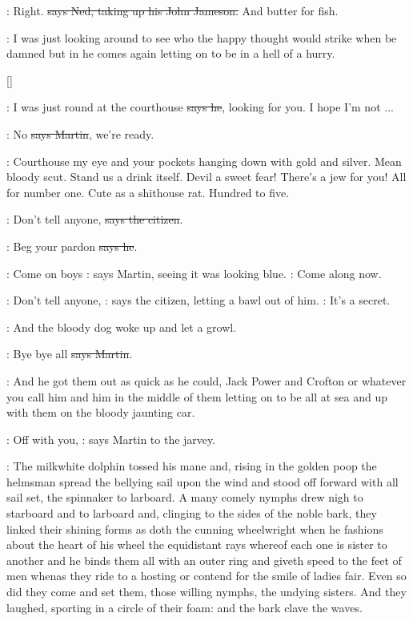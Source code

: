 \lambert:
Right. \sout{says Ned, taking up his John Jameson.}
And butter for fish.

\Nq:
I was just looking around to see who the happy thought would strike
when be damned but in he comes again letting on to be in a hell of a
hurry.

[]

\Bloom:
I was just round at the courthouse \sout{says he},
looking for you. I hope I'm
not ...

\cunningham:
No \sout{says Martin}, we're ready.

\Nq:
Courthouse my eye and your pockets hanging down with gold and silver.
Mean bloody scut. Stand us a drink itself. Devil a sweet fear! There's
a jew for you! All for number one. Cute as a shithouse rat. Hundred to
five.

\citizen:
Don't tell anyone, \sout{says the citizen}.

\Bloom:
Beg your pardon \sout{says he}.

\cunningham:
Come on boys
\Nq:
says Martin, seeing it was looking blue.
\cunningham:
Come along now.

\citizen:
Don't tell anyone,
\Nq:
says the citizen, letting a bawl out of him.
\citizen:
It's a secret.

\Nq:
And the bloody dog woke up and let a growl.

\cunningham:
Bye bye all \sout{says Martin}.

\Nq:
And he got them out as quick as he could, Jack Power and Crofton or
whatever you call him and him in the middle of them letting on to be all
at sea and up with them on the bloody jaunting car.

\cunningham:
Off with you,
\Nq:
says Martin to the jarvey.

:
The milkwhite dolphin tossed his mane and, rising in the golden poop
the helmsman spread the bellying sail upon the wind and stood off forward
with all sail set, the spinnaker to larboard. A many comely nymphs drew
nigh to starboard and to larboard and, clinging to the sides of the noble
bark, they linked their shining forms as doth the cunning wheelwright when
he fashions about the heart of his wheel the equidistant rays whereof each
one is sister to another and he binds them all with an outer ring and
giveth speed to the feet of men whenas they ride to a hosting or contend
for the smile of ladies fair. Even so did they come and set them, those
willing nymphs, the undying sisters. And they laughed, sporting in a
circle of their foam: and the bark clave the waves.

